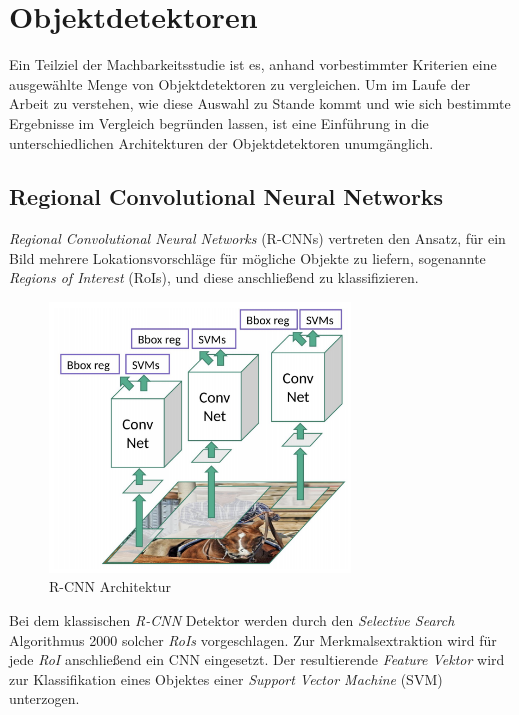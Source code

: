 \section{Objektdetektoren} \label{detection}

Ein Teilziel der Machbarkeitsstudie ist es, anhand vorbestimmter Kriterien eine ausgewählte Menge von Objektdetektoren zu vergleichen. Um im Laufe der Arbeit zu verstehen, wie diese Auswahl zu Stande kommt und wie sich bestimmte Ergebnisse im Vergleich begründen lassen, ist eine Einführung in die unterschiedlichen Architekturen der Objektdetektoren unumgänglich. 

\subsection*{Regional Convolutional Neural Networks}

\textit{Regional Convolutional Neural Networks} (R-CNNs) vertreten den Ansatz, für ein Bild mehrere Lokationsvorschläge für mögliche Objekte zu liefern, sogenannte \textit{Regions of Interest} (RoIs), und diese anschließend zu klassifizieren. 

\begin{figure}[H]
	\begin{center}
		\includegraphics[width=8cm]{Bilder/rcnn.png} 
		\caption[R-CNN Architektur]{R-CNN Architektur \cite{RohithGandhi.20180709}}
		\label{rcnn}
	\end{center}
\end{figure}

Bei dem klassischen \textit{R-CNN} Detektor werden durch den \textit{Selective Search} Algorithmus 2000 solcher \textit{RoIs} vorgeschlagen. Zur Merkmalsextraktion wird für jede \textit{RoI} anschließend ein CNN eingesetzt. Der resultierende \textit{Feature Vektor} wird zur Klassifikation eines Objektes einer \textit{Support Vector Machine} (SVM) unterzogen. 

